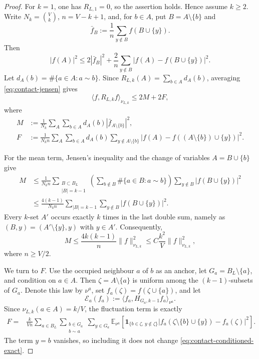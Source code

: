 \documentclass[11pt]{article}
\numberwithin{equation}{section}
\theoremstyle{remark}
\newcommand{\1}{\mathbf 1}
\newcommand{\cE}{\mathcal E}
\begin{document}
\begin{proof}
For \(k=1\), one has \(R_{L,1}=0\), so the assertion holds.  Hence assume
\(k\geq2\).  Write \(N_k=\binom Vk\), \(n=V-k+1\), and, for \(b\in A\),
put \(B=A\setminus\{b\}\) and
\[
 \bar f_B:=\frac1n\sum_{y\notin B}f(B\cup\{y\}).
\]
Then
\begin{equation}
 |f(A)|^2\leq2|\bar f_B|^2
 +\frac2n\sum_{y\notin B}|f(A)-f(B\cup\{y\})|^2.
 \label{eq:contact-jensen}
\end{equation}
Let \(d_A(b)=\#\{a\in A:a\sim b\}\).  Since
\(R_{L,k}(A)=\sum_{b\in A}d_A(b)\), averaging
\eqref{eq:contact-jensen} gives
\[
 \langle f,R_{L,k}f\rangle_{\nu_{L,k}}\leq2M+2F,
\]
where
\begin{align*}
 M&:=\frac1{N_k}\sum_A\sum_{b\in A}
 d_A(b)|\bar f_{A\setminus\{b\}}|^2,\\
 F&:=\frac1{N_kn}\sum_A\sum_{b\in A}d_A(b)
 \sum_{y\notin A\setminus\{b\}}
 |f(A)-f((A\setminus\{b\})\cup\{y\})|^2.
\end{align*}

For the mean term, Jensen's inequality and the change of variables
\(A=B\cup\{b\}\) give
\begin{align*}
 M
 &\leq\frac1{N_kn}
 \sum_{\substack{B\subset B_L\\|B|=k-1}}
 \left(\sum_{b\notin B}\#\{a\in B:a\sim b\}\right)
 \sum_{y\notin B}|f(B\cup\{y\})|^2 \\
 &\leq\frac{4(k-1)}{N_kn}
 \sum_{|B|=k-1}\sum_{y\notin B}|f(B\cup\{y\})|^2.
\end{align*}
Every \(k\)-set \(A'\) occurs exactly \(k\) times in the last double
sum, namely as \((B,y)=(A'\setminus\{y\},y)\) with \(y\in A'\).
Consequently,
\begin{equation}
 M\leq\frac{4k(k-1)}n\|f\|_{\nu_{L,k}}^2
 \leq C\frac{k^2}V\|f\|_{\nu_{L,k}}^2,
 \label{eq:contact-mean-bound}
\end{equation}
where \(n\geq V/2\).

We turn to \(F\).  Use the occupied neighbour \(a\) of \(b\) as an
anchor, let \(G_a=B_L\setminus\{a\}\), and condition on \(a\in A\).
Then \(\zeta=A\setminus\{a\}\) is uniform among the \((k-1)\)-subsets
of \(G_a\).  Denote this law by \(\nu^a\), set
\(f_a(\zeta)=f(\zeta\cup\{a\})\), and let
\[
 \cE_a(f_a):=
 \langle f_a,H_{G_a,k-1}f_a\rangle_{\nu^a}.
\]
Since \(\nu_{L,k}(a\in A)=k/V\), the fluctuation term is exactly
\begin{align}
 F={}&\frac{k}{Vn}\sum_{a\in B_L}
 \sum_{\substack{b\in G_a\\b\sim a}}
 \sum_{y\in G_a}
 \mathbb E_{\nu^a}\left[
 \1_{\{b\in\zeta,\,y\notin\zeta\}}
 \left|f_a(\zeta\setminus\{b\}\cup\{y\})-f_a(\zeta)\right|^2
 \right].
 \label{eq:contact-conditioned-exact}
\end{align}
The term \(y=b\) vanishes, so including it does not change
\eqref{eq:contact-conditioned-exact}.


\end{proof}
\end{document}
